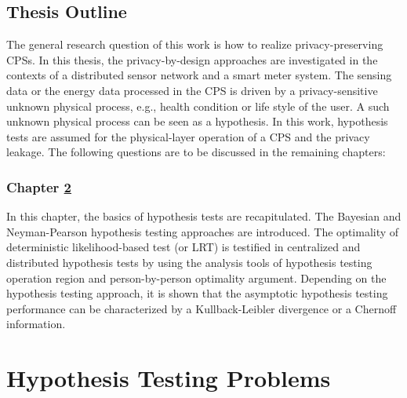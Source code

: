 \documentclass[g5paper,phd,electronic]{kthesis}
\numberwithin{theorem}{chapter}
\numberwithin{lemma}{chapter}
\numberwithin{proposition}{chapter}
\numberwithin{corollary}{chapter}
\numberwithin{remark}{chapter}
\numberwithin{property}{chapter}
\numberwithin{conjecture}{chapter}
\numberwithin{assumption}{chapter}
\numberwithin{algorithm}{chapter}
\begin{document}
\section{Thesis Outline}
\label{section1.3}
The general research question of this work is {how to realize privacy-preserving CPSs}. In this thesis, the privacy-by-design approaches are investigated in the contexts of a distributed sensor network and a smart meter system. The sensing data or the energy data processed in the CPS is driven by a privacy-sensitive unknown physical process, e.g., health condition or life style of the user. A such unknown physical process can be seen as a hypothesis. In this work, hypothesis tests are assumed for the physical-layer operation of a CPS and the privacy leakage. The following questions are to be discussed in the remaining chapters:

\subsection{Chapter \ref{chapter2}}
In this chapter, the basics of hypothesis tests are recapitulated. The Bayesian and Neyman-Pearson hypothesis testing approaches are introduced. The optimality of deterministic likelihood-based test (or LRT) is testified in centralized and distributed hypothesis tests by using the analysis tools of hypothesis testing operation region and person-by-person optimality argument. Depending on the hypothesis testing approach, it is shown that the asymptotic hypothesis testing performance can be characterized by a Kullback-Leibler divergence or a Chernoff information.

\chapter{Hypothesis Testing Problems}
\label{chapter2}
\printindex


\end{document}
